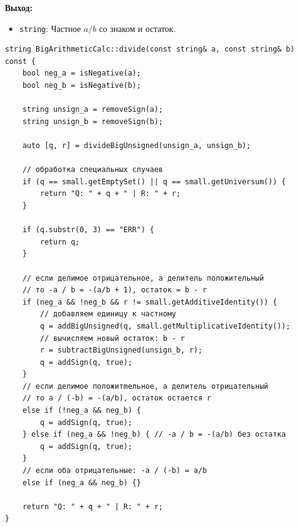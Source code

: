 \textbf{Выход:}
\begin{itemize}
    \item \texttt{string}: Частное $a / b$ со знаком и остаток.
\end{itemize}

\begin{lstlisting}[style=cstyle, caption={Реализация divide()}]
string BigArithmeticCalc::divide(const string& a, const string& b) const {
    bool neg_a = isNegative(a);
    bool neg_b = isNegative(b);

    string unsign_a = removeSign(a);
    string unsign_b = removeSign(b);
    
    auto [q, r] = divideBigUnsigned(unsign_a, unsign_b);
    
    // обработка специальных случаев
    if (q == small.getEmptySet() || q == small.getUniversum()) {
        return "Q: " + q + " | R: " + r;
    }
    
    if (q.substr(0, 3) == "ERR") {
        return q;
    }
    
    // если делимое отрицательное, а делитель положительный
    // то -a / b = -(a/b + 1), остаток = b - r
    if (neg_a && !neg_b && r != small.getAdditiveIdentity()) {
        // добавляем единицу к частному
        q = addBigUnsigned(q, small.getMultiplicativeIdentity());
        // вычисляем новый остаток: b - r
        r = subtractBigUnsigned(unsign_b, r);
        q = addSign(q, true);
    }
    // если делимое положитmельное, а делитель отрицательный
    // то a / (-b) = -(a/b), остаток остается r
    else if (!neg_a && neg_b) {
        q = addSign(q, true);
    } else if (neg_a && !neg_b) { // -a / b = -(a/b) без остатка
        q = addSign(q, true);
    }
    // если оба отрицательные: -a / (-b) = a/b
    else if (neg_a && neg_b) {}
    
    return "Q: " + q + " | R: " + r;
}
\end{lstlisting}

